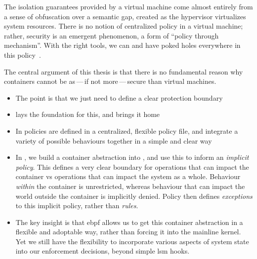 The isolation guarantees provided by a virtual machine come almost entirely from a sense
of obfuscation over a semantic gap, created as the hypervisor virtualizes system
resources. There is no notion of centralized policy in a virtual machine; rather, security
is an emergent phenomenon, a form of \enquote{policy through mechanism}. With the right
tools, we can and have poked holes everywhere in this
policy~\cite{dubrelle2015_hypervisor, thongthua2016_analysis, shahzad2017_systematic}.

The central argument of this thesis is that there is no fundamental reason why containers
cannot be as\,---\,if not more\,---\,secure than virtual machines.
\begin{inprogress}
  \begin{itemize}
    \item The point is that we just need to define a clear protection boundary
    \item \bpfbox{} lays the foundation for this, and \bpfcontain{} brings it home
    \item In \bpfbox{} policies are defined in a centralized, flexible policy file, and
          integrate a variety of possible behaviours together in a simple and clear way
    \item In \bpfcontain{}, we build a container abstraction into \bpfbox{}, and use this
          to inform an \textit{implicit policy}. This defines a very clear boundary for
          operations that can impact the container vs operations that can impact the system as
          a whole. Behaviour \textit{within} the container is unrestricted, whereas behaviour
          that can impact the world outside the container is implicitly denied. Policy then
          defines \textit{exceptions} to this implicit policy, rather than \textit{rules}.
    \item The key insight is that \gls{ebpf} allows us to get this container abstraction
          in a flexible and adoptable way, rather than forcing it into the mainline kernel.
          Yet we still have the flexibility to incorporate various aspects of system state
          into our enforcement decisions, beyond simple \gls{lsm} hooks.
  \end{itemize}
\end{inprogress}

